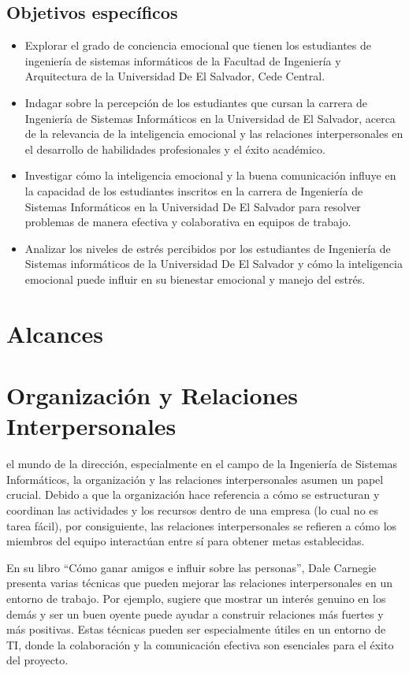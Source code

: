 \documentclass[journal]{IEEEtran}
\begin{document}
\subsection{Objetivos específicos}
\begin{itemize}
	\item Explorar el grado de conciencia emocional que tienen los estudiantes de ingeniería de sistemas informáticos de la Facultad de Ingeniería y Arquitectura de la Universidad De El Salvador, Cede Central.
	\item Indagar sobre la percepción de los estudiantes que cursan la carrera de Ingeniería de Sistemas Informáticos en la Universidad de El Salvador, acerca de la relevancia de la inteligencia emocional y las relaciones interpersonales en el desarrollo de habilidades profesionales y el éxito académico.
	\item Investigar cómo la inteligencia emocional y la buena comunicación influye en la capacidad de los estudiantes inscritos en la carrera de Ingeniería de Sistemas Informáticos en la Universidad De El Salvador para resolver problemas de manera efectiva y colaborativa en equipos de trabajo.
	\item Analizar los niveles de estrés percibidos por los estudiantes de Ingeniería de Sistemas informáticos de la Universidad De El Salvador y cómo la inteligencia emocional puede influir en su bienestar emocional y manejo del estrés.
	
\end{itemize}

\section{Alcances}

\section{Organización y Relaciones Interpersonales}
 el mundo de la dirección, especialmente en el campo de la Ingeniería de Sistemas Informáticos, la organización y las relaciones interpersonales asumen un papel crucial. Debido a que la organización hace referencia a cómo se estructuran y coordinan las actividades y los recursos dentro de una empresa (lo cual no es tarea fácil), por consiguiente, las relaciones interpersonales se refieren a cómo los miembros del equipo interactúan entre sí para obtener metas establecidas.

En su libro “Cómo ganar amigos e influir sobre las personas”, Dale Carnegie presenta varias técnicas que pueden mejorar las relaciones interpersonales en un entorno de trabajo. Por ejemplo, sugiere que mostrar un interés genuino en los demás y ser un buen oyente puede ayudar a construir relaciones más fuertes y más positivas. Estas técnicas pueden ser especialmente útiles en un entorno de TI, donde la colaboración y la comunicación efectiva son esenciales para el éxito del proyecto.
\end{document}
